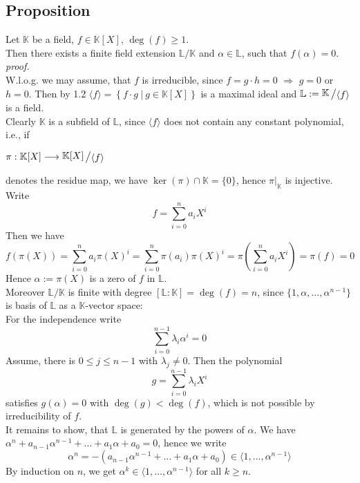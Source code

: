 \documentclass[12pt]{book}
\newcommand{\slant}[2]{{\raisebox{.1em}{$#1$}\left/\raisebox{-.1em}{$#2$}\right.}}
\begin{document}
\begin{spacing}{1.3}
\subsection{Proposition} %
\titleformat{\subsection}{\normalfont\normalsize\bfseries}{}{0em}{#1 \thesubsection}
Let $\mathbb{K}$ be a field, $f \in \mathbb{K}[X]$, $\deg(f)\geqslant 1$.\\
Then there exists a finite field extension $\mathbb{L}/\mathbb{K}$ and $\alpha \in \mathbb{L}$, such that $f(\alpha)=0$.\\
\textit{proof.}\\
W.l.o.g. we may assume, that $f$ is irreducible, since $f=g \cdot h =0$ $\Rightarrow$ $g=0$ or $h=0$. Then by 1.2 $\langle f \rangle= \left\{f \cdot g \ \big \vert \ g \in \mathbb{K}[X]\right\}$ is a maximal ideal and $\mathbb{L}:=\slant{\mathbb{K}}{\langle f \rangle}$ is a field.\\
Clearly $\mathbb{K}$ is a subfield of $\mathbb{L}$, since $\langle f\rangle$ does not contain any constant polynomial, i.e., if 
\begin{center}$ \pi: \mathbb{K}[X] \longrightarrow \slant{\mathbb{K}[X]}{\langle f \rangle}$\end{center}
denotes the residue map, we have $\ker(\pi) \cap \mathbb{K}=\{0\}$, hence $\pi|_{\mathbb{K}}$ is injective.\\
Write $$f=\sum_{i=0}^n a_i X^{i}$$ Then we have
$$f\left(\pi(X)\right)=\sum_{i=0}^n a_i \pi(X)^{i}= \sum_{i=0}^{n}\pi(a_i) \pi(X)^{i}=\pi \left(\sum_{i=0}^n a_i X^{i}\right) = \pi(f)=0$$
Hence $\alpha:=\pi(X)$ is a zero of $f$ in $\mathbb{L}$.\\
Moreover $\mathbb{L}/\mathbb{K}$ is finite with degree $[\mathbb{L}:\mathbb{K}]=\deg(f)=n$, since $\{1,\alpha, \dots ,\alpha^{n-1}\}$ is basis of $\mathbb{L}$ as a $\mathbb{K}$-vector space:\\
For the independence write $$\sum_{i=0}^{n-1} \lambda_i \alpha^{i}=0$$Assume, there is $0\leqslant j \leqslant n-1$ with $\lambda_j \neq 0$. Then the polynomial $$g=\sum_{i=0}^{n-1} \lambda_i X^{i}$$ satisfies $g(\alpha)=0$ with $\deg(g)<\deg(f)$, which is not possible by irreducibility of $f$.\\
It remains to show, that $\mathbb{L}$ is generated by the powers of $\alpha$. We have $\alpha^n+a_{n-1}\alpha^{n-1}+ \dots +a_1 \alpha+a_0 = 0$, hence we write 
$$\alpha^n=-\left(a_{n-1}\alpha^{n-1}+ \dots + a_1 \alpha + a_0\right) \in \langle 1, \dots , \alpha^{n-1}\rangle$$
By induction on $n$, we get $\alpha^k \in \langle 1, \dots , \alpha^{n-1}\rangle$ for all $k \geqslant n$.


\end{spacing}
\end{document}
